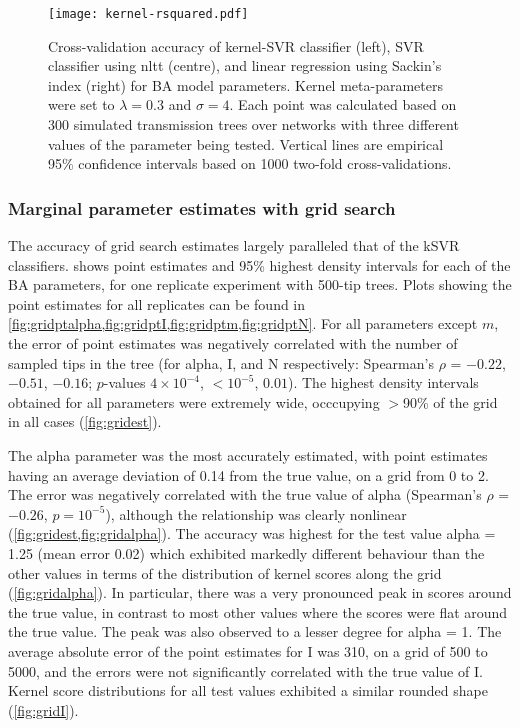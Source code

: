 \begin{figure}[ht]
  \centering
  \texttt{[image: kernel-rsquared.pdf]}
  \caption[Cross-validation accuracy of kernel-SVR, nLTT-based SVR, and
  Sackin's index regression classifiers for BA model parameters.]{
      Cross-validation accuracy of kernel-SVR classifier (left), SVR classifier
      using \gls{nltt} (centre), and linear regression using Sackin's index
      (right) for \gls{BA} model parameters. Kernel meta-parameters were set to
      $\lambda = 0.3$ and $\sigma = 4$. Each point was calculated based on 300
      simulated transmission trees over networks with three different values of
      the parameter being tested. Vertical lines are empirical 95\% confidence
      intervals based on 1000 two-fold cross-validations.
  }
  \label{fig:rsquared}
\end{figure}

\subsubsection*{Marginal parameter estimates with grid search}



The accuracy of grid search estimates largely paralleled that of the \gls{kSVR}
classifiers.  shows point estimates and 95\% highest density
intervals for each of the \gls{BA} parameters, for one replicate experiment
with 500-tip trees. Plots showing the point estimates for all replicates can be
found in \cref{fig:gridptalpha,fig:gridptI,fig:gridptm,fig:gridptN}. For all
parameters except $m$, the error of point estimates was negatively correlated
with the number of sampled tips in the tree (for
\gls{alpha}, \gls{I}, and \gls{N} respectively: Spearman's $\rho$ = 
    \ensuremath{-0.22},
    \ensuremath{-0.51},
    \ensuremath{-0.16};
$p$-values
    $4\!\times\!10^{-4}$,
    ${<}10^{-5}$,
    $0.01$).
The highest density intervals obtained for all parameters were extremely wide,
occcupying $>$90\% of the grid in all cases (\cref{fig:gridest}).

The \gls{alpha} parameter was the most accurately estimated, with point
estimates having an average deviation of 
    0.14
from the true value, on a grid from 0 to 2. The error was negatively correlated
with the true value of \gls{alpha} 
    (Spearman's $\rho$ = \ensuremath{-0.26},
     $p = 10^{-5}$),
although the relationship was clearly nonlinear (\cref{fig:gridest,fig:gridalpha}).
The accuracy was highest for the test value \gls{alpha} = 1.25
    (mean error 0.02)
which exhibited markedly different behaviour than the other values in terms of
the distribution of kernel scores along the grid (\cref{fig:gridalpha}). In
particular, there was a very pronounced peak in scores around the true value,
in contrast to most other values where the scores were flat around the true
value. The peak was also observed to a lesser degree for \gls{alpha} = 1. The
average absolute error of the point estimates for \gls{I} was 
    310,
on a grid of 500 to 5000, and the errors were not significantly correlated with
the true value of \gls{I}. Kernel score distributions for all test values
exhibited a similar rounded shape (\cref{fig:gridI}). 

